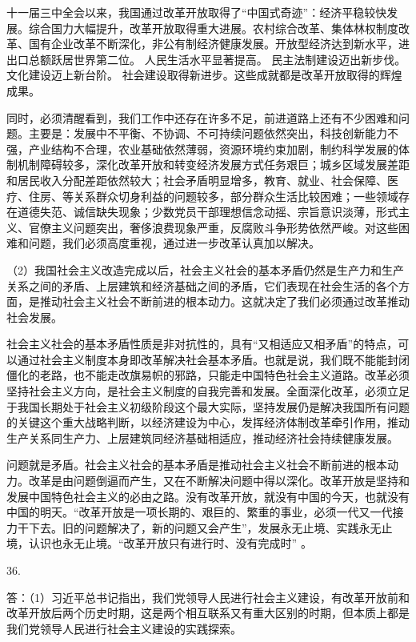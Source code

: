 \documentclass[a4paper]{article}
\begin{document}
十一届三中全会以来，我国通过改革开放取得了“中国式奇迹”：经济平稳较快发展。综合国力大幅提升，改革开放取得重大进展。农村综合改革、集体林权制度改革、国有企业改革不断深化，非公有制经济健康发展。开放型经济达到新水平，进出口总额跃居世界第二位。 人民生活水平显著提高。 民主法制建设迈出新步伐。 文化建设迈上新台阶。 社会建设取得新进步。这些成就都是改革开放取得的辉煌成果。

同时，必须清醒看到，我们工作中还存在许多不足，前进道路上还有不少困难和问题。主要是：发展中不平衡、不协调、不可持续问题依然突出，科技创新能力不强，产业结构不合理，农业基础依然薄弱，资源环境约束加剧，制约科学发展的体制机制障碍较多，深化改革开放和转变经济发展方式任务艰巨；城乡区域发展差距和居民收入分配差距依然较大；社会矛盾明显增多，教育、就业、社会保障、医疗、住房、等关系群众切身利益的问题较多，部分群众生活比较困难；一些领域存在道德失范、诚信缺失现象；少数党员干部理想信念动摇、宗旨意识淡薄，形式主义、官僚主义问题突出，奢侈浪费现象严重，反腐败斗争形势依然严峻。对这些困难和问题，我们必须高度重视，通过进一步改革认真加以解决。

（2）我国社会主义改造完成以后，社会主义社会的基本矛盾仍然是生产力和生产关系之间的矛盾、上层建筑和经济基础之间的矛盾，它们表现在社会生活的各个方面，是推动社会主义社会不断前进的根本动力。这就决定了我们必须通过改革推动社会发展。

社会主义社会的基本矛盾性质是非对抗性的，具有“又相适应又相矛盾”的特点，可以通过社会主义制度本身即改革解决社会基本矛盾。也就是说，我们既不能能封闭僵化的老路，也不能走改旗易帜的邪路，只能走中国特色社会主义道路。改革必须坚持社会主义方向，是社会主义制度的自我完善和发展。全面深化改革，必须立足于我国长期处于社会主义初级阶段这个最大实际，坚持发展仍是解决我国所有问题的关键这个重大战略判断，以经济建设为中心，发挥经济体制改革牵引作用，推动生产关系同生产力、上层建筑同经济基础相适应，推动经济社会持续健康发展。

问题就是矛盾。社会主义社会的基本矛盾是推动社会主义社会不断前进的根本动力。改革是由问题倒逼而产生，又在不断解决问题中得以深化。改革开放是坚持和发展中国特色社会主义的必由之路。没有改革开放，就没有中国的今天，也就没有中国的明天。“改革开放是一项长期的、艰巨的、繁重的事业，必须一代又一代接力干下去。旧的问题解决了，新的问题又会产生”，发展永无止境、实践永无止境，认识也永无止境。“改革开放只有进行时、没有完成时” 。

36.

答：（1）习近平总书记指出，我们党领导人民进行社会主义建设，有改革开放前和改革开放后两个历史时期，这是两个相互联系又有重大区别的时期，但本质上都是我们党领导人民进行社会主义建设的实践探索。
\end{document}

